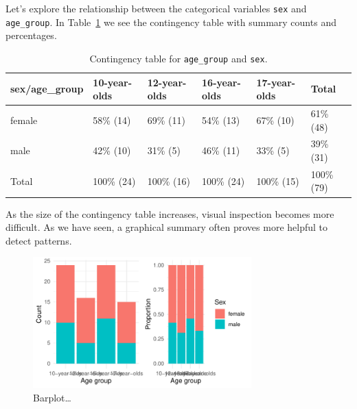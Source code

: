\documentclass[
  letterpaper,
]{latex/krantz}
\begin{document}
Let's explore the relationship between the categorical variables
\texttt{sex} and \texttt{age\_group}. In
Table~\ref{tbl-summaries-bivariate-categorical-table-belc} we see the
contingency table with summary counts and percentages.

\hypertarget{tbl-summaries-bivariate-categorical-table-belc}{}
\begin{table}
\caption{\label{tbl-summaries-bivariate-categorical-table-belc}Contingency table for \texttt{age\_group} and \texttt{sex}. }\tabularnewline

\centering
\begin{tabular}{llllll}
\toprule
sex/age\_group & 10-year-olds & 12-year-olds & 16-year-olds & 17-year-olds & Total\\
\midrule
female & 58\% (14) & 69\% (11) & 54\% (13) & 67\% (10) & 61\% (48)\\
male & 42\% (10) & 31\%  (5) & 46\% (11) & 33\%  (5) & 39\% (31)\\
Total & 100\% (24) & 100\% (16) & 100\% (24) & 100\% (15) & 100\% (79)\\
\bottomrule
\end{tabular}
\end{table}

As the size of the contingency table increases, visual inspection
becomes more difficult. As we have seen, a graphical summary often
proves more helpful to detect patterns.

\begin{figure}[h]

{\centering \includegraphics[width=0.75\textwidth,height=\textheight]{approaching-analysis_files/figure-pdf/fig-summaries-bivariate-categorical-barplot-belc-1.pdf}

}

\caption{\label{fig-summaries-bivariate-categorical-barplot-belc}Barplot\ldots{}}

\end{figure}
\end{document}
